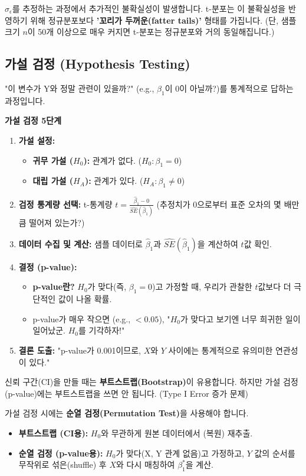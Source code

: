 \documentclass[11pt,a4paper]{book}
\theoremstyle{definition}
\begin{document}
$\sigma_\epsilon$를 추정하는 과정에서 추가적인 불확실성이 발생합니다. t-분포는 이 불확실성을 반영하기 위해 정규분포보다 \textbf{'꼬리가 두꺼운(fatter tails)'} 형태를 가집니다.
(단, 샘플 크기 $n$이 50개 이상으로 매우 커지면 t-분포는 정규분포와 거의 동일해집니다.)

\subsection{가설 검정 (Hypothesis Testing)}

"이 변수가 Y와 정말 관련이 있을까?" (e.g., $\beta_1$이 0이 아닐까?)를 통계적으로 답하는 과정입니다.

\textbf{가설 검정 5단계}
\begin{enumerate}
    \item \textbf{가설 설정:}
        \begin{itemize}
            \item \textbf{귀무 가설 ($H_0$):} 관계가 없다. ($H_0: \beta_1 = 0$)
            \item \textbf{대립 가설 ($H_A$):} 관계가 있다. ($H_A: \beta_1 \neq 0$)
        \end{itemize}
    \item \textbf{검정 통계량 선택:} t-통계량 $t = \frac{\hat{\beta}_1 - 0}{\hat{SE}(\hat{\beta}_1)}$
        (추정치가 0으로부터 표준 오차의 몇 배만큼 떨어져 있는가?)
    \item \textbf{데이터 수집 및 계산:} 샘플 데이터로 $\hat{\beta}_1$과 $\hat{SE}(\hat{\beta}_1)$을 계산하여 $t$값 확인.
    \item \textbf{결정 (p-value):}
        \begin{itemize}
            \item \textbf{p-value란?} $H_0$가 맞다(즉, $\beta_1=0$)고 가정할 때, 우리가 관찰한 $t$값보다 더 극단적인 값이 나올 확률.
            \item p-value가 매우 작으면 (e.g., $< 0.05$), "$H_0$가 맞다고 보기엔 너무 희귀한 일이 일어났군. $H_0$를 기각하자!"
        \end{itemize}
    \item \textbf{결론 도출:} "p-value가 0.001이므로, $X$와 $Y$ 사이에는 통계적으로 유의미한 연관성이 있다."
\end{enumerate}

\begin{warningbox}[title=가설 검정을 위한 부트스트랩? $\rightarrow$ 순열 검정!]
    신뢰 구간(CI)을 만들 때는 \textbf{부트스트랩(Bootstrap)}이 유용합니다. 하지만 가설 검정(p-value)에는 부트스트랩을 쓰면 안 됩니다. (Type I Error 증가 문제)

    가설 검정 시에는 \textbf{순열 검정(Permutation Test)}을 사용해야 합니다.

    \begin{itemize}
        \item \textbf{부트스트랩 (CI용):} $H_0$와 무관하게 원본 데이터에서 (복원) 재추출.
        \item \textbf{순열 검정 (p-value용):} $H_0$가 맞다(X, Y 관계 없음)고 가정하고, $Y$ 값의 순서를 무작위로 섞은(shuffle) 후 $X$와 다시 매칭하여 $\beta_1^*$을 계산.
    \end{itemize}
\end{warningbox}
\end{document}
